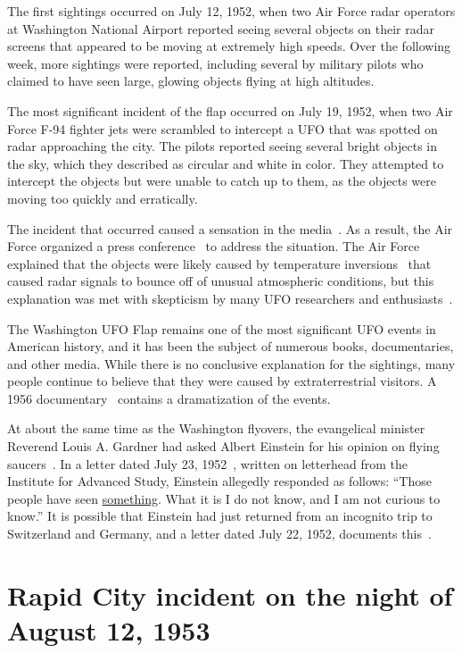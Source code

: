 The first sightings occurred on July 12, 1952, when two Air Force radar operators at Washington National Airport reported seeing several objects on their radar screens that appeared to be moving at extremely high speeds. Over the following week, more sightings were reported, including several by military pilots who claimed to have seen large, glowing objects flying at high altitudes.

The most significant incident of the flap occurred on July 19, 1952, when two Air Force F-94 fighter jets were scrambled to intercept a UFO that was spotted on radar approaching the city. The pilots reported seeing several bright objects in the sky, which they described as circular and white in color. They attempted to intercept the objects but were unable to catch up to them, as the objects were moving too quickly and erratically.

The incident that occurred caused a sensation in the media~\cite{Carlson2002Jul}.
As a result, the Air Force organized a press conference~\cite{Samford1952,Archives1952} to address the situation.
The Air Force explained that the objects were likely caused by temperature inversions~\cite{Menzel_1953,BoydMenzel1963Jan}
that caused radar signals to bounce off of unusual atmospheric conditions, but this explanation was met with skepticism by many UFO
researchers and enthusiasts~\cite{Keyhoe1955,Keyhoe1953,Randle2001Oct}.

The Washington UFO Flap remains one of the most significant UFO events in American history, and it has been the subject of numerous books, documentaries, and other media. While there is no conclusive explanation for the sightings, many people continue to believe that they were caused by extraterrestrial visitors.
A 1956 documentary~\cite{UFODOCU1956} contains a dramatization of the events.

At about the same time as the Washington flyovers, the evangelical minister Reverend Louis A. Gardner
had asked Albert Einstein for his opinion on flying saucers~\cite{McCarthy2023Jan}.
In a letter dated July 23, 1952~\cite{EinsteinGardner1952}, written on letterhead from the Institute for Advanced Study, Einstein allegedly responded as follows: ``Those people have seen \underline{something}. What it is I do not know, and I am not curious to know.'' It is possible that Einstein had just returned from an incognito trip to Switzerland and Germany, and a letter dated July 22, 1952, documents this~\cite{Kleinknecht2015}.
\section{Rapid City incident on the night of August 12, 1953}
\label{2023-UFO-part-History-chapter-post-1945-pre-1953-RC53}

